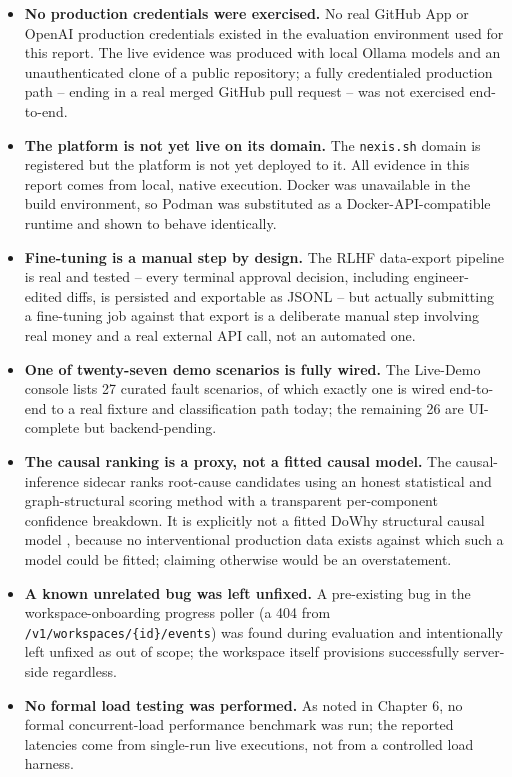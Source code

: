 \begin{itemize}
  \item \textbf{No production credentials were exercised.} No real GitHub
  App or OpenAI production credentials existed in the evaluation environment
  used for this report. The live evidence was produced with local Ollama
  models \cite{ollama} and an unauthenticated clone of a public repository;
  a fully credentialed production path -- ending in a real merged GitHub
  pull request -- was not exercised end-to-end.
  \item \textbf{The platform is not yet live on its domain.} The
  \texttt{nexis.sh} domain is registered but the platform is not yet
  deployed to it. All evidence in this report comes from local, native
  execution. Docker was unavailable in the build environment, so Podman
  \cite{podman} was substituted as a Docker-API-compatible runtime and shown
  to behave identically.
  \item \textbf{Fine-tuning is a manual step by design.} The RLHF
  data-export pipeline is real and tested -- every terminal approval
  decision, including engineer-edited diffs, is persisted and exportable as
  JSONL -- but actually submitting a fine-tuning job against that export is
  a deliberate manual step involving real money and a real external API
  call, not an automated one.
  \item \textbf{One of twenty-seven demo scenarios is fully wired.} The
  Live-Demo console lists 27 curated fault scenarios, of which exactly one
  is wired end-to-end to a real fixture and classification path today; the
  remaining 26 are UI-complete but backend-pending.
  \item \textbf{The causal ranking is a proxy, not a fitted causal model.}
  The causal-inference sidecar ranks root-cause candidates using an honest
  statistical and graph-structural scoring method with a transparent
  per-component confidence breakdown. It is explicitly not a fitted DoWhy
  structural causal model \cite{dowhy}, because no interventional production
  data exists against which such a model could be fitted; claiming otherwise
  would be an overstatement.
  \item \textbf{A known unrelated bug was left unfixed.} A pre-existing bug
  in the workspace-onboarding progress poller (a 404 from
  \texttt{/v1/workspaces/\{id\}/events}) was found during evaluation and
  intentionally left unfixed as out of scope; the workspace itself
  provisions successfully server-side regardless.
  \item \textbf{No formal load testing was performed.} As noted in
  Chapter 6, no formal concurrent-load performance benchmark was run; the
  reported latencies come from single-run live executions, not from a
  controlled load harness.
\end{itemize}

